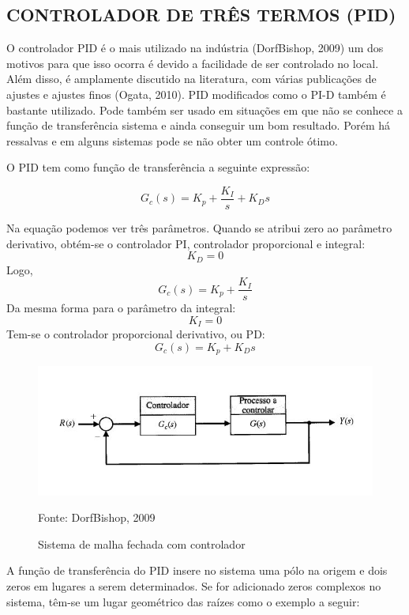 \documentclass[a4paper,12pt]{article}
\begin{document}
\subsection{CONTROLADOR DE TRÊS TERMOS (PID)}
O controlador PID é o mais utilizado na indústria (DorfBishop, 2009) um dos motivos para que isso ocorra é devido a facilidade de ser controlado no local. Além disso, é amplamente discutido na literatura, com várias publicações de ajustes e ajustes finos (Ogata, 2010). PID modificados como o PI-D também é bastante utilizado. Pode também ser usado em situações em que não se conhece a função de transferência sistema e ainda conseguir um bom resultado. Porém há ressalvas e em alguns sistemas pode se não obter um controle ótimo.

O PID tem como função de transferência a seguinte expressão:

\begin{equation}\label{eq:1}
G_c(s) = K_p + \frac{K_I}{s} + K_D s
\end{equation}

Na equação podemos ver três parâmetros. Quando se atribui zero ao parâmetro derivativo, obtém-se o controlador PI, controlador proporcional e integral:  \[K_D = 0 \] 
Logo, \[G_c(s) = K_p + \frac{K_I}{s} \]
Da mesma forma para o parâmetro da integral:
\[K_I = 0 \] 
Tem-se o controlador proporcional derivativo, ou PD: \[G_c(s) = K_p + K_D s \]

\begin{figure}[!h]
\centering
\includegraphics[scale=1]{controlador-malha-fechada.JPG}
\caption{Sistema de malha fechada com controlador}
\label{fig:sistema}
{Fonte: DorfBishop, 2009}
\end{figure}

A função de transferência do PID insere no sistema uma pólo na origem e dois zeros em lugares a serem determinados. Se for adicionado zeros complexos no sistema, têm-se um lugar geométrico das raízes como o exemplo a seguir: 
\end{document}
